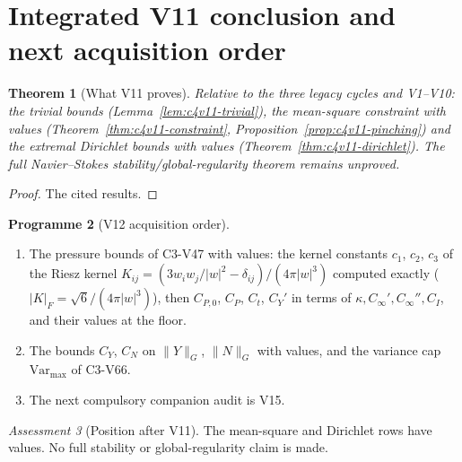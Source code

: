 \documentclass[11pt]{article}
\theoremstyle{plain}
\newtheorem{theorem}{Theorem}[section]
\theoremstyle{definition}
\newtheorem{programme}[theorem]{Programme}
\theoremstyle{remark}
\newtheorem{assessment}[theorem]{Assessment}
\begin{document}
\section{Integrated V11 conclusion and next acquisition order}
\label{sec:c4v11-conclusion}

\begin{theorem}[What V11 proves]
\label{thm:c4v11-conclusion}
Relative to the three legacy cycles and V1--V10: the trivial bounds
(Lemma~\ref{lem:c4v11-trivial}), the mean-square constraint with values
(Theorem~\ref{thm:c4v11-constraint}, Proposition~\ref{prop:c4v11-pinching})
and the extremal Dirichlet bounds with values
(Theorem~\ref{thm:c4v11-dirichlet}).  The full Navier--Stokes
stability/global-regularity theorem remains unproved.
\end{theorem}

\begin{proof}
The cited results.
\end{proof}

\begin{programme}[V12 acquisition order]
\label{prog:c4v12}
\begin{enumerate}[label=\textup{(AC\arabic*)},leftmargin=4.8em]
\item The pressure bounds of C3-V47 with values: the kernel constants
      \(c_1\), \(c_2\), \(c_3\) of the Riesz kernel \(K_{ij}=(3w_iw_j/|w|^2-\delta_{ij})/(4\pi|w|^3)\)
      computed exactly (\(|K|_F=\sqrt6/(4\pi|w|^3)\)), then
      \(C_{P,0}\), \(C_P\), \(C_t\), \(C_Y'\) in terms of \(\kappa,C_\infty',C_\infty'',C_I\), and their values at the
      floor.
\item The bounds \(C_Y\), \(C_N\) on \(\|Y\|_G\), \(\|N\|_G\) with values, and the
      variance cap \(\mathrm{Var}_{\max}\) of C3-V66.
\item The next compulsory companion audit is V15.
\end{enumerate}
\end{programme}

\begin{assessment}[Position after V11]
\label{ass:c4v11-position}
The mean-square and Dirichlet rows have values.  No full stability
or global-regularity claim is made.
\end{assessment}

\end{document}
